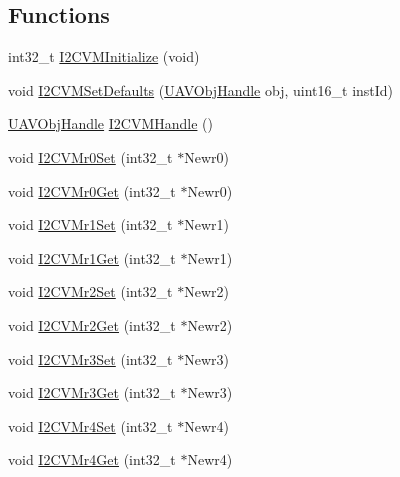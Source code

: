 \subsection*{\-Functions}
\begin{DoxyCompactItemize}
\item 
int32\-\_\-t \hyperlink{group___i2_c_v_m_ga969f6946940316eb305b09a8d3a664af}{\-I2\-C\-V\-M\-Initialize} (void)
\item 
void \hyperlink{group___i2_c_v_m_ga182fae307d5c616b55dea813fabfda37}{\-I2\-C\-V\-M\-Set\-Defaults} (\hyperlink{targets_2_u_a_v_objects_2inc_2uavobjectmanager_8h_a279053e22be53ce9f895043aaeb91e3b}{\-U\-A\-V\-Obj\-Handle} obj, uint16\-\_\-t inst\-Id)
\item 
\hyperlink{targets_2_u_a_v_objects_2inc_2uavobjectmanager_8h_a279053e22be53ce9f895043aaeb91e3b}{\-U\-A\-V\-Obj\-Handle} \hyperlink{group___i2_c_v_m_ga9de75c81bcfaa8f63aadab7d29f8056a}{\-I2\-C\-V\-M\-Handle} ()
\item 
void \hyperlink{group___i2_c_v_m_gaaf254c34bbf2bd84405dc98379559c77}{\-I2\-C\-V\-Mr0\-Set} (int32\-\_\-t $\ast$\-Newr0)
\item 
void \hyperlink{group___i2_c_v_m_gab4590e2d96466f06361107f71fcde531}{\-I2\-C\-V\-Mr0\-Get} (int32\-\_\-t $\ast$\-Newr0)
\item 
void \hyperlink{group___i2_c_v_m_ga9eb97df778a08ab0db92180adf9477a9}{\-I2\-C\-V\-Mr1\-Set} (int32\-\_\-t $\ast$\-Newr1)
\item 
void \hyperlink{group___i2_c_v_m_gaa34e9ce81d515c6ba0e9a0edefc7cf84}{\-I2\-C\-V\-Mr1\-Get} (int32\-\_\-t $\ast$\-Newr1)
\item 
void \hyperlink{group___i2_c_v_m_ga307aa2f64dbf51b6e9136feaa0fe28ad}{\-I2\-C\-V\-Mr2\-Set} (int32\-\_\-t $\ast$\-Newr2)
\item 
void \hyperlink{group___i2_c_v_m_ga013e59a5c52faf448dda46c75b77b3e6}{\-I2\-C\-V\-Mr2\-Get} (int32\-\_\-t $\ast$\-Newr2)
\item 
void \hyperlink{group___i2_c_v_m_ga9c7d7817907e0148dd99d39087f19dc0}{\-I2\-C\-V\-Mr3\-Set} (int32\-\_\-t $\ast$\-Newr3)
\item 
void \hyperlink{group___i2_c_v_m_gaabe61dee38d9d4be97a8f19025580cf4}{\-I2\-C\-V\-Mr3\-Get} (int32\-\_\-t $\ast$\-Newr3)
\item 
void \hyperlink{group___i2_c_v_m_gadfc21f1d2a59035ba639e67677d21dae}{\-I2\-C\-V\-Mr4\-Set} (int32\-\_\-t $\ast$\-Newr4)
\item 
void \hyperlink{group___i2_c_v_m_gae989d6c6c9c0b96edb63be9f441e1f60}{\-I2\-C\-V\-Mr4\-Get} (int32\-\_\-t $\ast$\-Newr4)

\end{DoxyCompactItemize}
